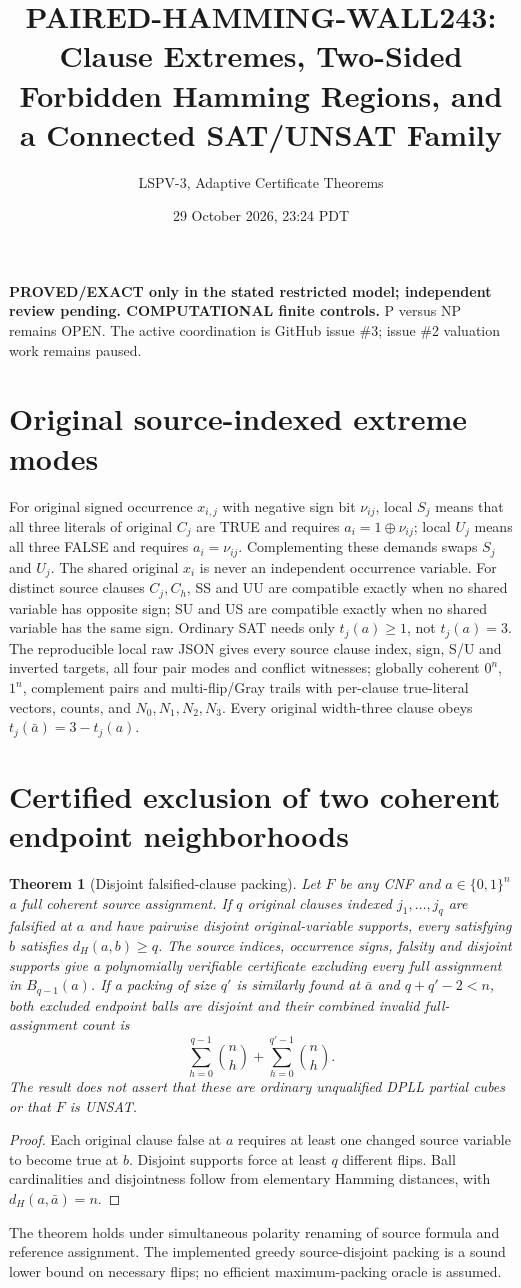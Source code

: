 \documentclass[10pt]{article}
\title{PAIRED-HAMMING-WALL243: Clause Extremes, Two-Sided Forbidden Hamming Regions, and a Connected SAT/UNSAT Family}
\author{LSPV-3, Adaptive Certificate Theorems}
\date{29 October 2026, 23:24 PDT}
\newtheorem{theorem}{Theorem}
\begin{document}
\maketitle
\noindent \textbf{PROVED/EXACT only in the stated restricted model; independent review pending. COMPUTATIONAL finite controls.} P versus NP remains OPEN. The active coordination is GitHub issue \#3; issue \#2 valuation work remains paused.
\section{Original source-indexed extreme modes}
For original signed occurrence $x_{i,j}$ with negative sign bit $\nu_{ij}$, local $S_j$ means that all three literals of original $C_j$ are TRUE and requires $a_i=1\oplus\nu_{ij}$; local $U_j$ means all three FALSE and requires $a_i=\nu_{ij}$. Complementing these demands swaps $S_j$ and $U_j$. The shared original $x_i$ is never an independent occurrence variable. For distinct source clauses $C_j,C_h$, SS and UU are compatible exactly when no shared variable has opposite sign; SU and US are compatible exactly when no shared variable has the same sign. Ordinary SAT needs only $t_j(a)\ge1$, not $t_j(a)=3$. The reproducible local raw JSON gives every source clause index, sign, S/U and inverted targets, all four pair modes and conflict witnesses; globally coherent $0^n$, $1^n$, complement pairs and multi-flip/Gray trails with per-clause true-literal vectors, counts, and $N_0,N_1,N_2,N_3$. Every original width-three clause obeys $t_j(\bar a)=3-t_j(a)$.
\section{Certified exclusion of two coherent endpoint neighborhoods}
\begin{theorem}[Disjoint falsified-clause packing]
Let $F$ be any CNF and $a\in\{0,1\}^n$ a full coherent source assignment. If $q$ original clauses indexed $j_1,\ldots,j_q$ are falsified at $a$ and have pairwise disjoint original-variable supports, every satisfying $b$ satisfies $d_H(a,b)\ge q$. The source indices, occurrence signs, falsity and disjoint supports give a polynomially verifiable certificate excluding every full assignment in $B_{q-1}(a)$. If a packing of size $q'$ is similarly found at $\bar a$ and $q+q'-2<n$, both excluded endpoint balls are disjoint and their combined invalid full-assignment count is
\[
 \sum_{h=0}^{q-1}\binom nh+\sum_{h=0}^{q'-1}\binom nh.
\]
The result does not assert that these are ordinary unqualified DPLL partial cubes or that $F$ is UNSAT.
\end{theorem}
\begin{proof}
Each original clause false at $a$ requires at least one changed source variable to become true at $b$. Disjoint supports force at least $q$ different flips. Ball cardinalities and disjointness follow from elementary Hamming distances, with $d_H(a,\bar a)=n$.
\end{proof}
The theorem holds under simultaneous polarity renaming of source formula and reference assignment. The implemented greedy source-disjoint packing is a sound lower bound on necessary flips; no efficient maximum-packing oracle is assumed.
\end{document}
